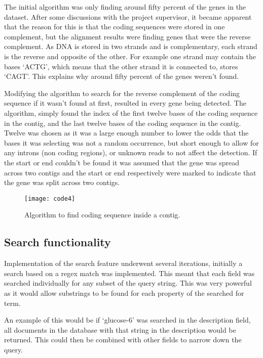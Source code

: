 The initial algorithm was only finding around fifty percent of the genes in the dataset. After some discussions with the project supervisor, it became apparent that the reason for this is that the coding sequences were stored in one complement, but the alignment results were finding genes that were the reverse complement. As DNA is stored in two strands and is complementary, each strand is the reverse and opposite of the other. For example one strand may contain the bases `ACTG', which means that the other strand it is connected to, stores `CAGT'. This explains why around fifty percent of the genes weren't found. 

Modifying the algorithm to search for the reverse complement of the coding sequence if it wasn't found at first, resulted in every gene being detected. The algorithm, simply found the index of the first twelve bases of the coding sequence in the contig, and the last twelve bases of the coding sequence in the contig. Twelve was chosen as it was a large enough number to lower the odds that the bases it was selecting was not a random occurrence, but short enough to allow for any introns (non coding regions), or unknown reads to not affect the detection. If the start or end couldn't be found it was assumed that the gene was spread across two contigs and the start or end respectively were marked to indicate that the gene was split across two contigs. 

\begin{figure}[H]
\begin{center}
\texttt{[image: code4]}
\caption{Algorithm to find coding sequence inside a contig. \label{overflow}}
\end{center}
\end{figure}

\subsection{Search functionality}
Implementation of the search feature underwent several iterations, initially a search based on a regex match was implemented. This meant that each field was searched individually for any subset of the query string. This was very powerful as it would allow substrings to be found for each property of the searched for term. 

An example of this would be if `glucose-6' was searched in the description field, all documents in the database with that string in the description would be returned. This could then be combined with other fields to narrow down the query. 

